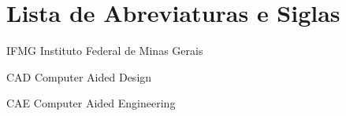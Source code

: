 \chapter*{Lista de Abreviaturas e Siglas}
\begin{acronym}[xxxxxxxxx]
  
  \item[IFMG] Instituto Federal de Minas Gerais
  \item[CAD] Computer Aided Design
  \item[CAE] Computer Aided Engineering

\end{acronym}